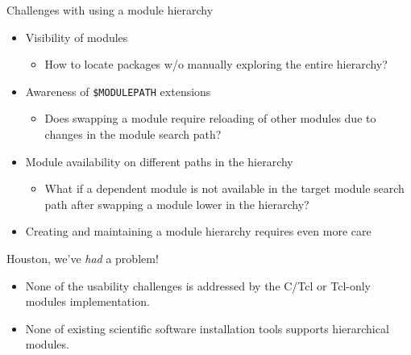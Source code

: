 \documentclass[10pt,xcolor={usenames,dvipsnames}]{beamer}
\begin{document}
\begin{frame}{Challenges with using a module hierarchy}
\begin{itemize}
    \item
        Visibility of modules
        \begin{itemize}
            \item
                How to locate packages w/o manually exploring the entire
                hierarchy?
        \end{itemize}
    \item
        Awareness of \texttt{\$MODULEPATH} extensions
        \begin{itemize}
            \item
                Does swapping a module require reloading of other modules due
                to changes in the module search path?
        \end{itemize}
    \item
        Module availability on different paths in the hierarchy
        \begin{itemize}
            \item
                What if a dependent module is not available in the target
                module search path after swapping a module lower in the
                hierarchy?
        \end{itemize}
    \item
        Creating and maintaining a module hierarchy requires even more care
\end{itemize}
\begin{center}
    \begin{minipage}{0.9\textwidth}
        \begin{alertblock}{Houston, we've \emph{had} a problem!}
            \footnotesize
            \begin{itemize}
                \item
                    None of the usability challenges is addressed by the
                    C/Tcl or Tcl-only modules implementation.
                \item
                    None of existing scientific software installation tools
                    supports hierarchical modules.
            \end{itemize}
        \end{alertblock}
    \end{minipage}
\end{center}
\end{frame}
\end{document}
